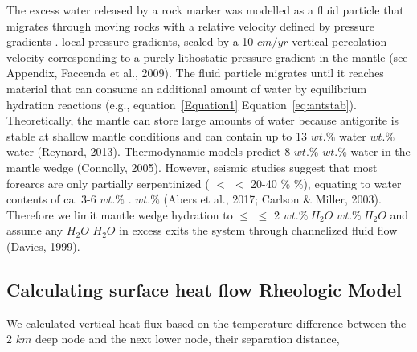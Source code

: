 \documentclass[draft,linenumbers]{agujournal2018} %
\providecommand{\DIFaddtex}[1]{{\protect\color{blue} \sf #1}} %
\providecommand{\DIFdeltex}[1]{{\protect\color{red} \scriptsize #1}} %
\providecommand{\DIFaddbegin}{} %
\providecommand{\DIFaddend}{} %
\providecommand{\DIFdelbegin}{} %
\providecommand{\DIFdelend}{} %
\providecommand{\DIFadd}[1]{\texorpdfstring{\DIFaddtex{#1}}{#1}} %
\providecommand{\DIFdel}[1]{\texorpdfstring{\DIFdeltex{#1}}{}} %
\newcommand{\DIFscaledelfig}{0.3}
\newlength{\DIFdelgraphicswidth} %
\newlength{\DIFdelgraphicsheight} %
\newcommand{\DIFaddincludegraphics}[2][]{{\color{blue}\fbox{\DIFOincludegraphics[#1]{#2}}}} %
\newcommand{\DIFdelincludegraphics}[2][]{%
\sbox{\DIFdelgraphicsbox}{\DIFOincludegraphics[#1]{#2}}%
\settoboxwidth{\DIFdelgraphicswidth}{\DIFdelgraphicsbox} %
\settoboxtotalheight{\DIFdelgraphicsheight}{\DIFdelgraphicsbox} %
\scalebox{\DIFscaledelfig}{%
\parbox[b]{\DIFdelgraphicswidth}{\usebox{\DIFdelgraphicsbox}\\[-\baselineskip] \rule{\DIFdelgraphicswidth}{0em}}\llap{\resizebox{\DIFdelgraphicswidth}{\DIFdelgraphicsheight}{%
\setlength{\unitlength}{\DIFdelgraphicswidth}%
\begin{picture}(1,1)%
\thicklines\linethickness{2pt} %
{\color[rgb]{1,0,0}\put(0,0){\framebox(1,1){}}}%
{\color[rgb]{1,0,0}\put(0,0){\line( 1,1){1}}}%
{\color[rgb]{1,0,0}\put(0,1){\line(1,-1){1}}}%
\end{picture}%
}\hspace*{3pt}}} %
} %
\DeclareRobustCommand{\DIFaddbegin}{\DIFOaddbegin \let\includegraphics\DIFaddincludegraphics} %
\DeclareRobustCommand{\DIFaddend}{\DIFOaddend \let\includegraphics\DIFOincludegraphics} %
\DeclareRobustCommand{\DIFdelbegin}{\DIFOdelbegin \let\includegraphics\DIFdelincludegraphics} %
\DeclareRobustCommand{\DIFdelend}{\DIFOaddend \let\includegraphics\DIFOincludegraphics} %
\begin{document}
The excess water released by a rock marker was modelled as a fluid
particle that migrates through \DIFaddbegin \DIFadd{moving }\DIFaddend rocks with a \DIFaddbegin \DIFadd{relative }\DIFaddend velocity
defined by \DIFdelbegin \DIFdel{pressure gradients }%
\DIFdel{.}\DIFdelend \DIFaddbegin \DIFadd{local pressure gradients, scaled by a 10 \(cm/yr\) vertical
percolation velocity corresponding to a purely lithostatic pressure
gradient in the mantle (see Appendix, Faccenda et al., 2009). }\DIFaddend The fluid
particle migrates until it reaches material that can consume an
additional amount of water by equilibrium hydration reactions (e.g.,
\DIFdelbegin \DIFdel{equation~\ref{Equation1}}\DIFdelend \DIFaddbegin \DIFadd{Equation~\ref{eq:antstab}}\DIFaddend ). Theoretically, the mantle can store large
amounts of water because antigorite is stable at shallow mantle
conditions and can contain up to 13 \DIFdelbegin \DIFdel{$wt.\%$ water }%
\DIFdelend \DIFaddbegin \DIFadd{\(wt.\%\) water (Reynard, 2013)}\DIFaddend .
Thermodynamic models predict 8 \DIFdelbegin \DIFdel{$wt.\%$ }\DIFdelend \DIFaddbegin \DIFadd{\(wt.\%\) }\DIFaddend water in the mantle wedge
\DIFdelbegin %
\DIFdelend \DIFaddbegin \DIFadd{(Connolly, 2005)}\DIFaddend . However, seismic studies suggest that most forearcs
are only partially serpentinized (\DIFdelbegin \DIFdel{$<$ }\DIFdelend \DIFaddbegin \DIFadd{\(<\) }\DIFaddend 20-40 \DIFdelbegin \DIFdel{$\%$}\DIFdelend \DIFaddbegin \DIFadd{\(\%\)}\DIFaddend ), equating to water
contents of ca. 3-6 \DIFdelbegin \DIFdel{$wt.\%$ }%
\DIFdel{.}\DIFdelend \DIFaddbegin \DIFadd{\(wt.\%\) (Abers et al., 2017; Carlson \& Miller,
2003). }\DIFaddend Therefore we limit mantle wedge hydration to \DIFdelbegin \DIFdel{$\leq$ }\DIFdelend \DIFaddbegin \DIFadd{\(\leq\) }\DIFaddend 2
\DIFdelbegin \DIFdel{$wt.\% ~H_2O$ }\DIFdelend \DIFaddbegin \DIFadd{\(wt.\%\ H_{2}O\) }\DIFaddend and assume any \DIFdelbegin \DIFdel{$H_2O$ }\DIFdelend \DIFaddbegin \DIFadd{\(H_{2}O\) }\DIFaddend in excess exits the system
through channelized fluid flow \DIFdelbegin %
\DIFdelend \DIFaddbegin \DIFadd{(Davies, 1999)}\DIFaddend .

\subsection{\DIFdelbegin \DIFdel{Calculating surface heat flow}\DIFdelend \DIFaddbegin \DIFadd{Rheologic Model}\DIFaddend }
\DIFdelbegin \DIFdel{We calculated vertical heat flux based on the temperature difference between the 2 $km$ deep node and the next lower node, their separation distance, }\DIFdelend \DIFaddbegin
\end{document}
